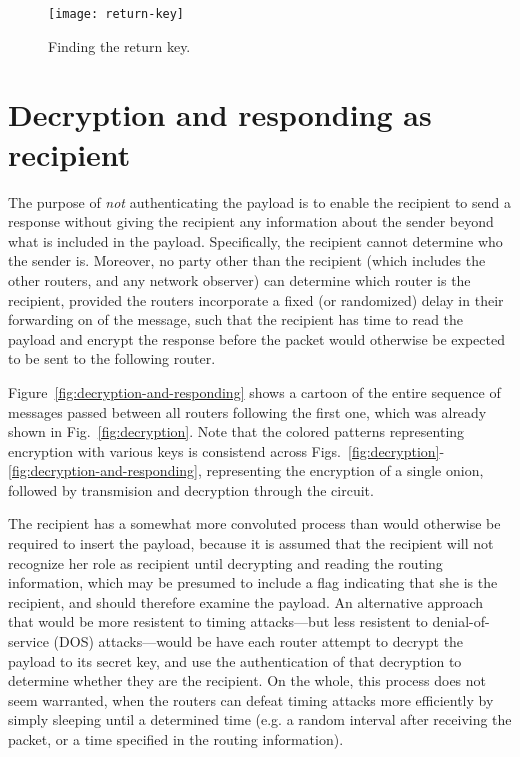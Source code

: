 \documentclass[letterpaper,twocolumn,amsmath,amssymb,pre,aps,10pt]{revtex4-1}
\begin{document}
\begin{figure*}
  \begin{center}
    \texttt{[image: return-key]}
  \end{center}
  \caption{Finding the return key.}\label{fig:return-key}
\end{figure*}

\section{Decryption and responding as recipient}

The purpose of \emph{not} authenticating the payload is to enable the
recipient to send a response without giving the recipient any
information about the sender beyond what is included in the payload.
Specifically, the recipient cannot determine who the sender is.
Moreover, no party other than the recipient (which includes the other
routers, and any network observer) can determine which router is the
recipient, provided the routers incorporate a fixed (or randomized)
delay in their forwarding on of the message, such that the recipient
has time to read the payload and encrypt the response before the
packet would otherwise be expected to be sent to the following router.

Figure~\ref{fig:decryption-and-responding} shows a cartoon of the
entire sequence of messages passed between all routers following the
first one, which was already shown in Fig.~\ref{fig:decryption}.  Note
that the colored patterns representing encryption with various keys is
consistend across
Figs.~\ref{fig:decryption}-\ref{fig:decryption-and-responding},
representing the encryption of a single onion, followed by transmision
and decryption through the circuit.

The recipient has a somewhat more convoluted process than would
otherwise be required to insert the payload, because it is assumed
that the recipient will not recognize her role as recipient until
decrypting and reading the routing information, which may be presumed
to include a flag indicating that she is the recipient, and should
therefore examine the payload.  An alternative approach that would be
more resistent to timing attacks---but less resistent to
denial-of-service (DOS) attacks---would be have each router attempt to
decrypt the payload to its secret key, and use the authentication of
that decryption to determine whether they are the recipient.  On the
whole, this process does not seem warranted, when the routers can
defeat timing attacks more efficiently by simply sleeping until a
determined time (e.g. a random interval after receiving the packet, or
a time specified in the routing information).
\end{document}
